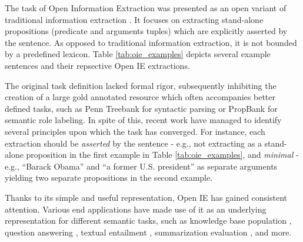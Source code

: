 
The task of Open Information Extraction was presented as an open variant of
traditional information extraction \cite{etzioni2008open}.
It focuses on extracting stand-alone propositions (predicate and arguments tuples)
which are explicitly asserted by the sentence.
As opposed to traditional information extraction, it is not bounded by a predefined lexicon.
Table \ref{tab:oie_examples} depicts several example sentences and their repsective Open IE extractions.

The original task definition lacked formal rigor,
subsequently inhibiting the creation of a large gold annotated resource
which often accompanies better defined tasks,
such as Penn Treebank \cite{ptb} for syntactic parsing or PropBank \cite{propbank} for semantic role labeling.
In spite of this, recent work \cite{bhutani2016nested,Stanovsky2016EMNLP} have managed
to identify several principles upon which the task has converged.
For instance, each extraction should be \emph{asserted} by the sentence -
e.g., not extracting  as a stand-alone proposition in the first example in Table \ref{tab:oie_examples},
and \emph{minimal} - e.g., ``Barack Obama'' and ``a former U.S. president''
as separate arguments yielding two separate propositions in the second example.


Thanks to its simple and useful representation, Open IE has gained consistent attention.
Various end applications have made use of it as an underlying representation for
different semantic tasks, such as knowledge base population
\cite{2015angeli-openie}, question answering \cite{fader2014open}, textual entailment \cite{Melamud:ACL13,Berant:ACL11}, summarization evaluation \cite{yang2016peak}, and more.

